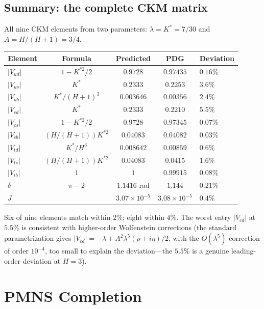 \documentclass[11pt,a4paper]{article}
\theoremstyle{definition}
\theoremstyle{remark}
\begin{document}
\subsection{Summary: the complete CKM matrix}\label{sec:ckm_summary}

All nine CKM elements from two parameters: $\lambda = K^* = 7/30$ and $A = H/(H+1) = 3/4$.

\begin{center}
\renewcommand{\arraystretch}{1.2}
\begin{tabular}{lcccl}
\toprule
Element & Formula & Predicted & PDG & Deviation \\
\midrule
$|V_{ud}|$ & $1 - K^{*2}/2$ & $0.9728$ & $0.97435$ & $0.16\%$ \\
$|V_{us}|$ & $K^*$ & $0.2333$ & $0.2253$ & $3.6\%$ \\
$|V_{ub}|$ & $K^*/(H+1)^3$ & $0.003646$ & $0.00356$ & $2.4\%$ \\
$|V_{cd}|$ & $K^*$ & $0.2333$ & $0.2210$ & $5.5\%$ \\
$|V_{cs}|$ & $1 - K^{*2}/2$ & $0.9728$ & $0.97345$ & $0.07\%$ \\
$|V_{cb}|$ & $(H/(H+1)) K^{*2}$ & $0.04083$ & $0.04082$ & $0.03\%$ \\
$|V_{td}|$ & $K^*/H^3$ & $0.008642$ & $0.00859$ & $0.6\%$ \\
$|V_{ts}|$ & $(H/(H+1)) K^{*2}$ & $0.04083$ & $0.0415$ & $1.6\%$ \\
$|V_{tb}|$ & $1$ & $1$ & $0.99915$ & $0.08\%$ \\
\midrule
$\delta$ & $\pi - 2$ & $1.1416$ rad & $1.144$ & $0.21\%$ \\
$J$ & & $3.07 \times 10^{-5}$ & $3.08 \times 10^{-5}$ & $0.4\%$ \\
\bottomrule
\end{tabular}
\end{center}

Six of nine elements match within $2\%$; eight within $4\%$. The worst entry $|V_{cd}|$ at $5.5\%$ is consistent with higher-order Wolfenstein corrections (the standard parametrization gives $|V_{cd}| = -\lambda + A^2\lambda^5(\rho + i\eta)/2$, with the $O(\lambda^5)$ correction of order $10^{-4}$, too small to explain the deviation---the $5.5\%$ is a genuine leading-order deviation at $H=3$).


\section{PMNS Completion}\label{sec:pmns}
\end{document}
